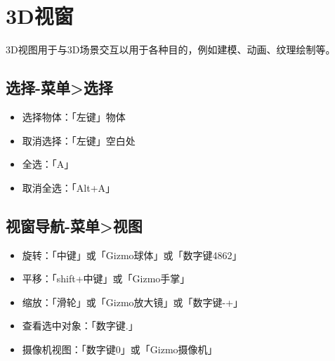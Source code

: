 \section{3D视窗}

\begin{intro}
    3D视图用于与3D场景交互以用于各种目的，例如建模、动画、纹理绘制等。
\end{intro}

\subsection{选择-菜单>选择}
\begin{itemize}
    \item 选择物体：「左键」物体
    \item 取消选择：「左键」空白处
    \item 全选：「A」
    \item 取消全选：「Alt+A」
\end{itemize}

\subsection{视窗导航-菜单>视图}
\begin{itemize}
    \item 旋转：「中键」或「Gizmo球体」或「数字键4862」
    \item 平移：「shift+中键」或「Gizmo手掌」
    \item 缩放：「滑轮」或「Gizmo放大镜」或「数字键-+」
    \item 查看选中对象：「数字键.」
    \item 摄像机视图：「数字键0」或「Gizmo摄像机」
\end{itemize}

